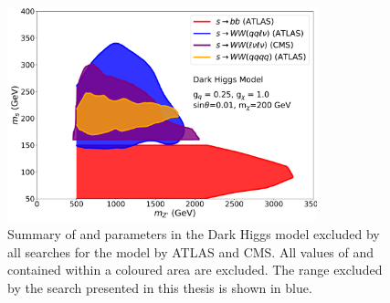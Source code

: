 \begin{figure}[h]
  \centering
  \includegraphics[width=0.8\textwidth]{Figures/8/combined_contour.pdf}
  \caption[]{Summary of \ms and \mZp parameters in the Dark Higgs model excluded by all searches for the model by ATLAS and CMS. All values of \ms and \mZp contained within a coloured area are excluded. The range excluded by the search presented in this thesis is shown in blue.}
  \label{fig:limits_comparison}
\end{figure}


